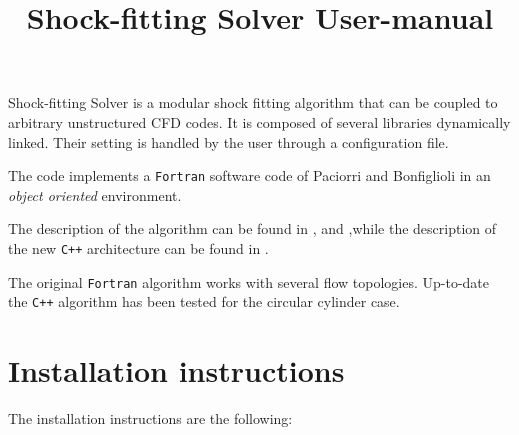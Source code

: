 \documentclass[11pt,a4paper,oneside]{article}
\begin{document}
\title{Shock-fitting Solver User-manual}
\maketitle

Shock-fitting Solver is a modular shock fitting algorithm that can be coupled to arbitrary unstructured CFD codes. It is composed of several libraries dynamically linked. Their setting is handled by the user through a configuration file. 

The code implements a \texttt{Fortran} software code of Paciorri and Bonfiglioli \cite{shockfittingalgorithm} in an \textit{object oriented} environment.

The description of the algorithm can be found in \cite{deamicisthesis}, \cite{deamicisreport} and \cite{shockfittingalgorithm},while the description of the new \texttt{C++} architecture can be found in \cite{deamicisthesis}.

The original \texttt{Fortran} algorithm works with several flow topologies. Up-to-date the \texttt{C++} algorithm has been tested for the circular cylinder case.


\section{Installation instructions}
\label{sec:installation instructions}

The installation instructions are the following:
\end{document}
